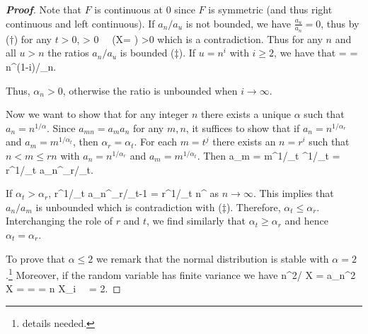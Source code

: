 \begin{proof}[\bf Proof]
Note that $F$ is continuous at 0 since $F$ is symmetric (and thus right continuous and left continuous). If $a_n/a_u$ is not bounded, we have $\frac{a_u }{a_n} = 0$, thus by ($\dag$) for any $t>0$,
\be
\pro{} \geq {} \pro{} > 0 \ \ra\ \pro(X= \infty) >0
\ee
which is a contradiction. Thus for any $n$ and all $u>n$ the ratios $a_n/a_u$ is bounded ($\ddag$). If $u=n^i$ with $i\geq 2$, we have that
\be
{} =  = n^{(1-i)/\alpha_n}.
\ee

Thus, $\alpha_n >0$, otherwise the ratio is unbounded when $i \to \infty$.
%
%

%
%

Now we want to show that for any integer $n$ there exists a unique $\alpha$ such that $a_n = n^{1/\alpha}$. Since $a_{mn} = a_ma_n$ for any $m,n$, it suffices to show that if $a_n = n^{1/\alpha_r}$ and $a_m = m^{1/\alpha_t}$, then $\alpha_r = \alpha_t$. For each $m = t^j$ there exists an $n = r^i$ such that $n< m\leq rn$ with $a_n = n^{1/\alpha_r}$ and $a_m = m^{1/\alpha_t}$. Then
\be
a_m = m^{1/\alpha_t} \leq {}^{1/\alpha_t} = r^{1/\alpha_t} a_n^{\alpha_r/\alpha_t}.
\ee

If $\alpha_t > \alpha_r$,
\be
{} \leq r^{1/\alpha_t} a_n^{\alpha_r/\alpha_t-1} = r^{1/\alpha_t} n^{} 
\ee
as $n\to\infty$. This implies that $a_n/a_m$ is unbounded which is contradiction with ($\ddag$). Therefore, $\alpha_t \leq \alpha_r$. Interchanging the role of $r$ and $t$, we find similarly that $\alpha_t \geq \alpha_r$ and hence $\alpha_t = \alpha_r$.


To prove that $\alpha \leq 2$ we remark that the normal distribution is stable with $\alpha =2$.\footnote{details needed.} Moreover, if the random variable has finite variance we have %
\be
n^{2/\alpha} \var X = a_n^2 \var X = \var{} = \var{} = n \var X_i \ \ra\ \alpha = 2.
\ee


\end{proof}
